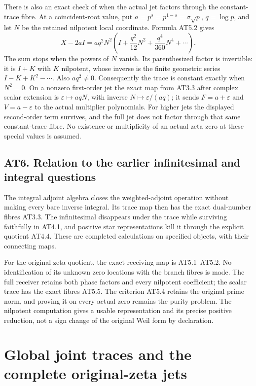 \documentclass[
]{article}
\begin{document}
There is also an exact check of when the actual jet factors through the
constant-trace fibre. At a coincident-root value, put
\(a=p^s=p^{1-s}=\sigma\sqrt p\), \(q=\log p\), and let \(N\) be the
retained nilpotent local coordinate. Formula AT5.2 gives \[
X-2aI=aq^2N^2\left(I+\frac{q^2}{12}N^2+\frac{q^4}{360}N^4+\cdots\right).
\tag{AT5.6}
\] The sum stops when the powers of \(N\) vanish. Its parenthesized
factor is invertible: it is \(I+K\) with \(K\) nilpotent, whose inverse
is the finite geometric series \(I-K+K^2-\cdots\). Also \(aq^2\ne0\).
Consequently the trace is constant exactly when \(N^2=0\). On a nonzero
first-order jet the exact map from AT3.3 after complex scalar extension
is \(\varepsilon\mapsto aqN\), with inverse
\(N\mapsto\varepsilon/(aq)\); it sends \(F=a+\varepsilon\) and
\(V=a-\varepsilon\) to the actual multiplier polynomials. For higher
jets the displayed second-order term survives, and the full jet does not
factor through that same constant-trace fibre. No existence or
multiplicity of an actual zeta zero at these special values is assumed.

\subsection{AT6. Relation to the earlier infinitesimal and integral
questions}\label{at6.-relation-to-the-earlier-infinitesimal-and-integral-questions}

The integral adjoint algebra closes the weighted-adjoint operation
without making every bare inverse integral. Its trace map then has the
exact dual-number fibres AT3.3. The infinitesimal disappears under the
trace while surviving faithfully in AT4.1, and positive star
representations kill it through the explicit quotient AT4.4. These are
completed calculations on specified objects, with their connecting maps.

For the original-zeta quotient, the exact receiving map is AT5.1--AT5.2.
No identification of its unknown zero locations with the branch fibres
is made. The full receiver retains both phase factors and every
nilpotent coefficient; the scalar trace has the exact fibres AT5.5. The
criterion AT5.4 retains the original prime norm, and proving it on every
actual zero remains the purity problem. The nilpotent computation gives
a usable representation and its precise positive reduction, not a sign
change of the original Weil form by declaration.

\section{Global joint traces and the complete original-zeta
jets}\label{global-joint-traces-and-the-complete-original-zeta-jets}
\end{document}
